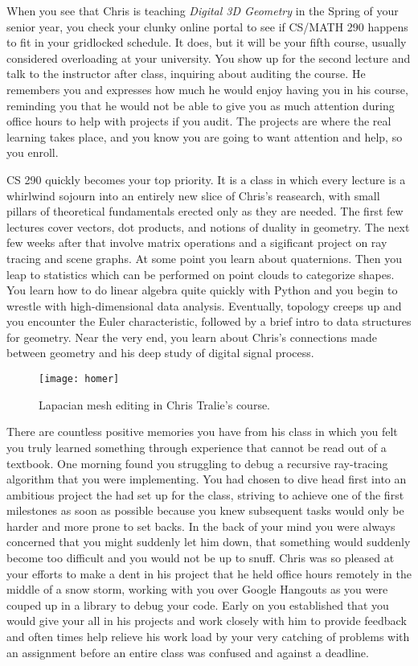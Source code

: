 \documentclass[../main.tex]{subfiles}
\begin{document}
When you see that Chris is teaching \textit{Digital 3D Geometry} in the Spring of your senior year, you check your clunky online portal to see if CS/MATH 290 happens to fit in your gridlocked schedule. It does, but it will be your fifth course, usually considered overloading at your university. You show up for the second lecture and talk to the instructor after class, inquiring about auditing the course. He remembers you and expresses how much he would enjoy having you in his course, reminding you that he would not be able to give you as much attention during office hours to help with projects if you audit. The projects are where the real learning takes place, and you know you are going to want attention and help, so you enroll.

CS 290 quickly becomes your top priority. It is a class in which every lecture is a whirlwind sojourn into an entirely new slice of Chris's reasearch, with small pillars of theoretical fundamentals erected only as they are needed. The first few lectures cover vectors, dot products, and notions of duality in geometry. The next few weeks after that involve matrix operations and a sigificant project on ray tracing and scene graphs. At some point you learn about quaternions. Then you leap to statistics which can be performed on point clouds to categorize shapes. You learn how to do linear algebra quite quickly with Python and you begin to wrestle with high-dimensional data analysis. Eventually, topology creeps up and you encounter the Euler characteristic, followed by a brief intro to data structures for geometry. Near the very end, you learn about Chris's connections made between geometry and his deep study of digital signal process.

\begin{figure}[h!]
	\centering
	\texttt{[image: homer]}
	\caption*{Lapacian mesh editing in Chris Tralie's course.}
\end{figure}

There are countless positive memories you have from his class in which you felt you truly learned something through experience that cannot be read out of a textbook. One morning found you struggling to debug a recursive ray-tracing algorithm that you were implementing. You had chosen to dive head first into an ambitious project the had set up for the class, striving to achieve one of the first milestones as soon as possible because you knew subsequent tasks would only be harder and more prone to set backs. In the back of your mind you were always concerned that you might suddenly let him down, that something would suddenly become too difficult and you would not be up to snuff. Chris was so pleased at your efforts to make a dent in his project that he held office hours remotely in the middle of a snow storm, working with you over Google Hangouts as you were couped up in a library to debug your code. Early on you established that you would give your all in his projects and work closely with him to provide feedback and often times help relieve his work load by your very catching of problems with an assignment before an entire class was confused and against a deadline. 
\end{document}
